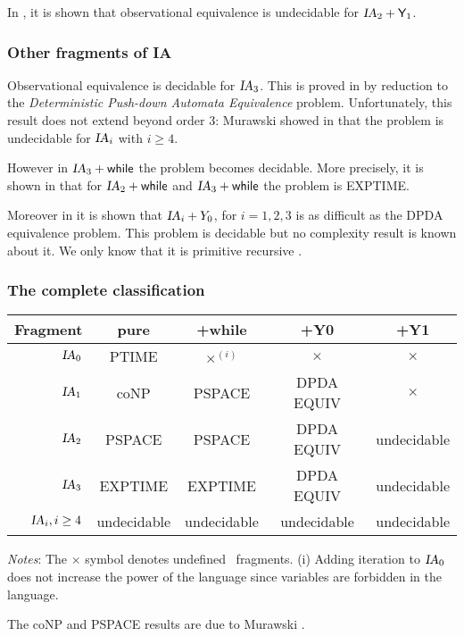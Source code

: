 In \cite{Ong02}, it is shown that observational equivalence is
undecidable for $\textsl{IA}_2 + \textsf{Y}_1$.


\subsubsection{Other fragments of IA}

Observational equivalence is decidable for $\textsl{IA}_3$. This is
proved in \cite{Ong02} by reduction to the \emph{Deterministic
Push-down Automata Equivalence} problem. Unfortunately, this result
does not extend beyond order $3$: Murawski showed in
\cite{murawski03program} that the problem is undecidable for
$\textsl{IA}_i$ with $i\geq4$.

However in $\textsl{IA}_3 + \textsf{while}$ the problem becomes
decidable. More precisely, it is shown in \cite{C:MW05} that
for $\textsl{IA}_2 + \textsf{while}$ and $\textsl{IA}_3 + \textsf{while}$ the problem is EXPTIME.

Moreover in \cite{C:MOW05} it is shown that $\textsl{IA}_i +Y_0$, for $i
= 1, 2, 3$ is as difficult as the DPDA equivalence problem. This
problem is decidable \citep{DBLP:journals/tcs/Senizergues01} but no
complexity result is known about it. We only know that it is
primitive recursive \citep{stirling02}.

\subsubsection{The complete classification}
\begin{center}
\begin{tabular}{rcccc}
Fragment  & pure & +while & +Y0 & +Y1 \\ \hline \hline
$\textsl{IA}_0$ & PTIME & $\times^{(i)}$ & $\times$ & $\times$  \\
$\textsl{IA}_1$ & coNP & PSPACE & DPDA EQUIV & $\times$ \\
$\textsl{IA}_2$ & PSPACE & PSPACE & DPDA EQUIV & undecidable \\
$\textsl{IA}_3$ &EXPTIME & EXPTIME & DPDA EQUIV & undecidable \\
$\textsl{IA}_i, i \geq 4$  & undecidable & undecidable & undecidable
& undecidable
\end{tabular}
\vspace{12pt}

\emph{Notes}: The $\times$ symbol denotes undefined \ialgol\ fragments.
(i) Adding iteration to $\textsl{IA}_0$ does not increase the power of the language since variables are forbidden in the language.
\end{center}

The coNP and PSPACE results are due to Murawski \citep{Mur04b}.

%
